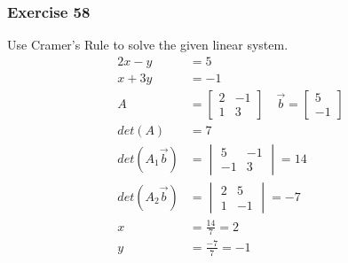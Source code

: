 \documentclass{math}
\begin{document}
\subsubsection*{Exercise 58}
Use Cramer's Rule to solve the given linear system.
\begin{align*}
  2x-y &= 5 \\
  x+3y &= -1 \\
  A &= \begin{bmatrix}2 & -1 \\ 1 & 3\end{bmatrix} \quad
    \vec{b} = \begin{bmatrix}5 \\ -1\end{bmatrix} \\
  det(A) &= 7 \\
  det(A_1\vec{b}) &= \begin{vmatrix}5 & -1 \\ -1 & 3 \end{vmatrix} = 14 \\
  det(A_2\vec{b}) &= \begin{vmatrix}2 & 5 \\ 1 & -1\end{vmatrix} = -7 \\
  x &= \frac{14}{7} = 2 \\
  y &= \frac{-7}{7} = -1
\end{align*}
\end{document}

